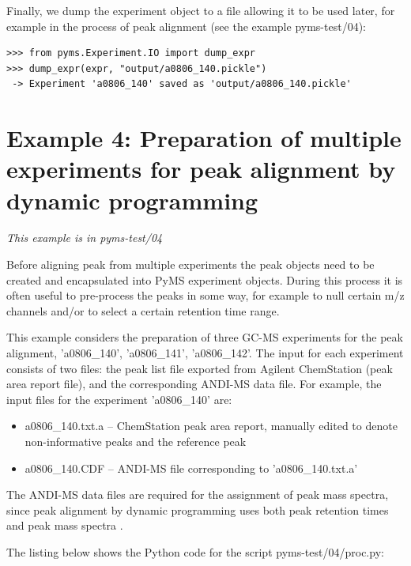 Finally, we dump the experiment object to a file allowing it to be used
later, for example in the process of peak alignment (see the example
pyms-test/04):

\begin{verbatim}
>>> from pyms.Experiment.IO import dump_expr
>>> dump_expr(expr, "output/a0806_140.pickle")
 -> Experiment 'a0806_140' saved as 'output/a0806_140.pickle'
\end{verbatim}

\section{Example 4: Preparation of multiple experiments for peak alignment
by dynamic programming}

\noindent
{\em This example is in pyms-test/04}

Before aligning peak from multiple experiments the peak objects need to be
created and encapsulated into PyMS experiment objects. During this process
it is often useful to pre-process the peaks in some way, for example to
null certain m/z channels and/or to select a certain retention time range.

This example considers the preparation of three GC-MS experiments for
the peak alignment, 'a0806\_140', 'a0806\_141', 'a0806\_142'. The input
for each experiment consists of two files: the peak list file exported
from Agilent ChemStation (peak area report file), and the corresponding
ANDI-MS data file. For example, the input files for the experiment
'a0806\_140' are:

\begin{itemize}
\item a0806\_140.txt.a -- ChemStation peak area report, manually edited
to denote non-informative peaks and the reference peak
\item a0806\_140.CDF -- ANDI-MS file corresponding to 'a0806\_140.txt.a'
\end{itemize}

The ANDI-MS data files are required for the assignment of peak mass spectra,
since peak alignment by dynamic programming uses both peak retention times
and peak mass spectra \cite{Robinson07}.

The listing below shows the Python code for the script pyms-test/04/proc.py:

